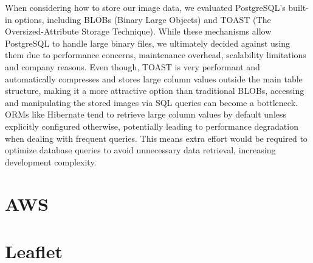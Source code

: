 When considering how to store our image data, we evaluated PostgreSQL’s built-in options, including BLOBs (Binary Large Objects) and TOAST (The Oversized-Attribute Storage Technique). While these mechanisms allow PostgreSQL to handle large binary files, we ultimately decided against using them due to performance concerns, maintenance overhead, scalability limitations and company reasons.
Even though, TOAST is very performant and automatically compresses and stores large column values outside the main table structure, making it a more attractive option than traditional BLOBs, accessing and manipulating the stored images via SQL queries can become a bottleneck. ORMs like Hibernate tend to retrieve large column values by default unless explicitly configured otherwise, potentially leading to performance degradation when dealing with frequent queries. This means extra effort would be required to optimize database queries to avoid unnecessary data retrieval, increasing development complexity.



\section{AWS}

\section{Leaflet}
